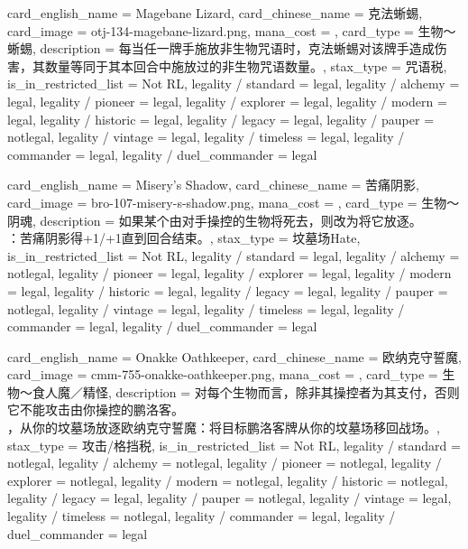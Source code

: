 \documentclass[lang = cn, color = black, 10pt]{AllThatStax}
\begin{document}
\card
{
	card_english_name = {Magebane Lizard},
	card_chinese_name = {克法蜥蜴},
	card_image = otj-134-magebane-lizard.png,
	mana_cost = ,
	card_type = 生物～蜥蜴,
	description = {每当任一牌手施放非生物咒语时，克法蜥蜴对该牌手造成伤害，其数量等同于其本回合中施放过的非生物咒语数量。},
	stax_type = 咒语税,
	is_in_restricted_list = Not RL,
	legality / standard = legal,
	legality / alchemy = legal,
	legality / pioneer = legal,
	legality / explorer = legal,
	legality / modern = legal,
	legality / historic = legal,
	legality / legacy = legal,
	legality / pauper = notlegal,
	legality / vintage = legal,
	legality / timeless = legal,
	legality / commander = legal,
	legality / duel_commander = legal
}

\card
{
	card_english_name = {Misery's Shadow},
	card_chinese_name = {苦痛阴影},
	card_image = bro-107-misery-s-shadow.png,
	mana_cost = ,
	card_type = 生物～阴魂,
	description = {如果某个由对手操控的生物将死去，则改为将它放逐。\\
：苦痛阴影得+1/+1直到回合结束。},
	stax_type = 坟墓场Hate,
	is_in_restricted_list = Not RL,
	legality / standard = legal,
	legality / alchemy = notlegal,
	legality / pioneer = legal,
	legality / explorer = legal,
	legality / modern = legal,
	legality / historic = legal,
	legality / legacy = legal,
	legality / pauper = notlegal,
	legality / vintage = legal,
	legality / timeless = legal,
	legality / commander = legal,
	legality / duel_commander = legal
}

\card
{
	card_english_name = {Onakke Oathkeeper},
	card_chinese_name = {欧纳克守誓魔},
	card_image = cmm-755-onakke-oathkeeper.png,
	mana_cost = ,
	card_type = 生物～食人魔／精怪,
	description = {对每个生物而言，除非其操控者为其支付，否则它不能攻击由你操控的鹏洛客。\\
，从你的坟墓场放逐欧纳克守誓魔：将目标鹏洛客牌从你的坟墓场移回战场。},
	stax_type = 攻击/格挡税,
	is_in_restricted_list = Not RL,
	legality / standard = notlegal,
	legality / alchemy = notlegal,
	legality / pioneer = notlegal,
	legality / explorer = notlegal,
	legality / modern = notlegal,
	legality / historic = notlegal,
	legality / legacy = legal,
	legality / pauper = notlegal,
	legality / vintage = legal,
	legality / timeless = notlegal,
	legality / commander = legal,
	legality / duel_commander = legal
}
\end{document}
